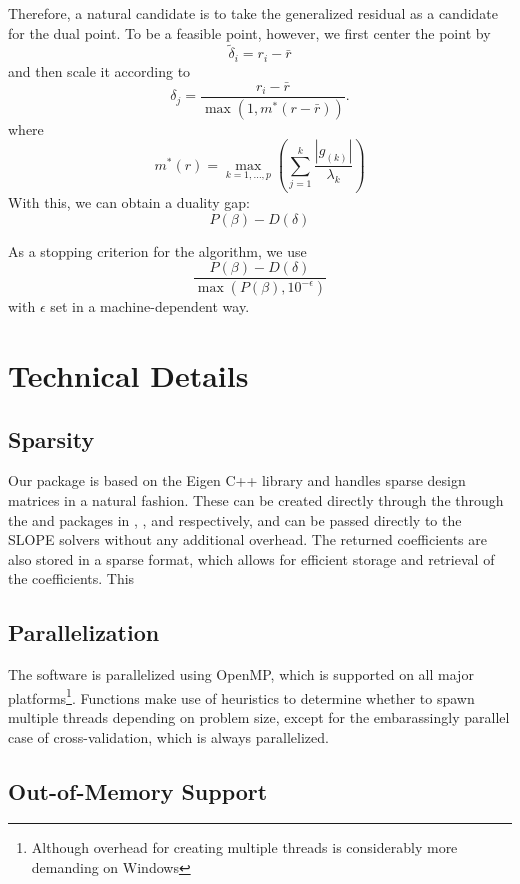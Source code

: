 \documentclass[article]{jss}
\begin{document}
Therefore, a natural candidate is to take the generalized residual as
a candidate for the dual point. To be a feasible point, however, we first
center the point by
\[
  \tilde{\delta}_i  = r_i - \bar{r}
\]
and then scale it according to
\[
  \delta_j = \frac{r_i - \bar{r}}{\max\left(1, m^*(r - \bar{r}) \right)}.
\]
where
\[
  m^*(r) = \max_{k=1,\ldots,p} \left(\sum_{j = 1}^k \frac{|g_{(k)}|}{\lambda_k} \right)
\]
With this, we can obtain a duality gap:
\[
  P(\beta) - D(\delta)
\]

As a stopping criterion for the algorithm, we use
\[
  \frac{P(\beta) - D(\delta)}{\max(P(\beta), 10^{-\epsilon})}
\]
with \(\epsilon\) set in a machine-dependent way.

\section{Technical Details}

\subsection{Sparsity}

Our package is based on the Eigen C++ library and handles sparse
design matrices in a natural fashion. These can be created directly through the
 through the  and  packages in
, , and  respectively, and
can be passed directly to the SLOPE solvers without any additional
overhead. The returned coefficients are also stored in a sparse format, which
allows for efficient storage and retrieval of the coefficients. This

\subsection{Parallelization}

The software is parallelized using OpenMP, which is supported
on all major platforms\footnote{Although overhead for creating
  multiple threads is considerably more demanding on Windows}.
Functions make use of heuristics to determine whether to
spawn multiple threads depending on problem size, except for
the embarassingly parallel case of cross-validation, which is always
parallelized.

\subsection{Out-of-Memory Support}
\end{document}
